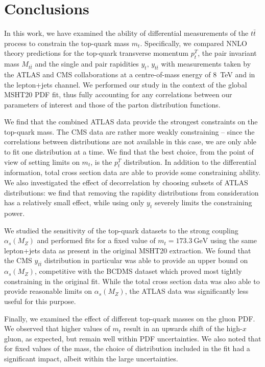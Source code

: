 \documentclass[sn-mathphys]{sn-jnl}%
\newcommand{\pT}{p^T_t}
\newcommand{\mtt}{M_{t\bar{t}}}
\newcommand{\yt}{y_{t}}
\newcommand{\ytt}{y_{t\bar{t}}}
\newcommand{\mt}{m_t}
\newcommand{\ttbar}{t\bar{t}}
\newcommand{\as}{\alpha_s(M_Z)}
\newcommand{\gev}{\mathrm{GeV}}
\begin{document}
\section{Conclusions}\label{conc}
In this work, we have examined the ability of differential measurements of the $\ttbar$ process to constrain the top-quark mass $\mt$. Specifically, we compared NNLO theory predictions for the top-quark transverse momentum $\pT$, the pair invariant mass $\mtt$ and the single and pair rapidities $\yt,\,\ytt$ with measurements taken by the ATLAS and CMS collaborations at a centre-of-mass energy of 8~TeV and in the lepton+jets channel. We performed our study in the context of the global MSHT20 PDF fit, thus fully accounting for any correlations between our parameters of interest and those of the parton distribution functions. 

We find that the combined ATLAS data provide the strongest constraints on the top-quark mass. The CMS data are rather more weakly constraining -- since the correlations between distributions are not available in this case, we are only able to fit one distribution at a time. We find that the best choice, from the point of view of setting limits on $\mt$, is the $\pT$ distribution. In addition to the differential information, total cross section data are able to provide some constraining ability. We also investigated the effect of decorrelation by choosing subsets of ATLAS distributions: we find that removing the rapidity distributions from consideration has a relatively small effect, while using only $\yt$ severely limits the constraining power. 

We studied the sensitivity of the top-quark datasets to the strong coupling $\as$ and performed fits for a fixed value of $\mt=173.3~\gev$ using the same lepton+jets data as present in the original MSHT20 extraction. We found that the CMS $\ytt$ distribution in particular was able to provide an upper bound on $\as$, competitive with the BCDMS dataset which proved most tightly constraining in the original fit. While the total cross section data was also able to provide reasonable limits on $\as$, the ATLAS data was significantly less useful for this purpose.

Finally, we examined the effect of different top-quark masses on the gluon PDF. We observed that higher values of $\mt$ result in an upwards shift of the high-$x$ gluon, as expected, but remain well within PDF uncertainties. We also noted that for fixed values of the mass, the choice of distribution included in the fit had a significant impact, albeit within the large uncertainties.
\end{document}
